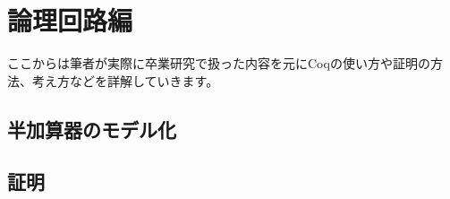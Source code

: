 \documentclass{jsbook}
\begin{document}
\chapter{論理回路編}
ここからは筆者が実際に卒業研究で扱った内容を元にCoqの使い方や証明の方法、考え方などを詳解していきます。
\newpage
\section{半加算器のモデル化}
\section{証明}
\end{document}
